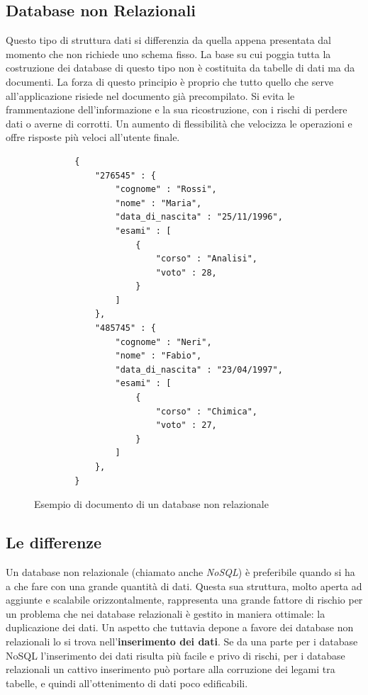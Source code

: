 \subsection{Database non Relazionali}
Questo tipo di struttura dati si differenzia da quella appena presentata dal momento che non richiede uno schema fisso. La base su cui poggia tutta la costruzione dei database di questo tipo non è costituita da tabelle di dati ma da documenti. La forza di questo principio è proprio che tutto quello che serve all’applicazione risiede nel documento già precompilato. Si evita le frammentazione dell’informazione e la sua ricostruzione, con i rischi di perdere dati o averne di corrotti. Un aumento di flessibilità che velocizza le operazioni e offre risposte più veloci all'utente finale.
\begin{figure}[H]
    \centering
    \begin{verbatim}
        {
            "276545" : {
                "cognome" : "Rossi",
                "nome" : "Maria",
                "data_di_nascita" : "25/11/1996",
                "esami" : [
                    {
                        "corso" : "Analisi",
                        "voto" : 28,
                    }
                ]
            },
            "485745" : {
                "cognome" : "Neri",
                "nome" : "Fabio",
                "data_di_nascita" : "23/04/1997",
                "esami" : [
                    {
                        "corso" : "Chimica",
                        "voto" : 27,
                    }
                ]
            },
        }
    \end{verbatim}
    \caption{Esempio di documento di un database non relazionale}
    \label{fig:nonrelational-database}
\end{figure}

\subsection{Le differenze}
Un database non relazionale (chiamato anche \textit{NoSQL}) è preferibile quando si ha a che fare con una grande quantità di dati. Questa sua struttura, molto aperta ad aggiunte e scalabile orizzontalmente, rappresenta una grande fattore di rischio per un problema che nei database relazionali è gestito in maniera ottimale: la duplicazione dei dati. Un aspetto che tuttavia depone a favore dei database non relazionali lo si trova nell'\textbf{inserimento dei dati}. Se da una parte per i database NoSQL l'inserimento dei dati risulta più facile e privo di rischi, per i database relazionali un cattivo inserimento può portare alla corruzione dei legami tra tabelle, e quindi all'ottenimento di dati poco edificabili. 

